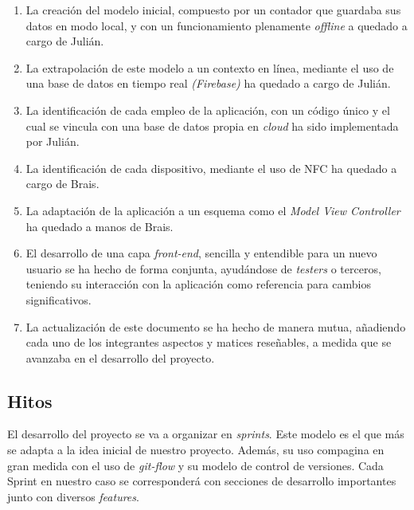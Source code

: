 \documentclass[a4paper,openright,12pt]{article}
\begin{document}
\begin{enumerate}
    \item La creación del modelo inicial, compuesto por un contador que guardaba sus datos en modo local, y con un funcionamiento plenamente \textit{offline} a quedado a cargo de Julián.
    \item La extrapolación de este modelo a un contexto en línea, mediante el uso de una base de datos en tiempo real \textit{(Firebase)} ha quedado a cargo de Julián.
    \item La identificación de cada empleo de la aplicación, con un código único y el cual se vincula con una base de datos propia en \textit{cloud} ha sido implementada por Julián.
    \item La identificación de cada dispositivo, mediante el uso de NFC ha quedado a cargo de Brais. 
    \item La adaptación de la aplicación a un esquema como el
    \textit{Model View Controller} ha quedado a manos de Brais.
    \item El desarrollo de una capa \textit{front-end}, sencilla y entendible para un nuevo usuario se ha hecho de forma conjunta, ayudándose de \textit{testers} o terceros, teniendo su interacción con la aplicación como referencia para cambios significativos.
    \item La actualización de este documento se ha hecho de manera mutua, añadiendo cada uno de los integrantes aspectos y matices reseñables, a medida que se avanzaba en el desarrollo del proyecto.
\end{enumerate}

\subsection{Hitos}
El desarrollo del proyecto se va a organizar en \textit{sprints}. Este modelo es el que más se adapta a la idea inicial de nuestro proyecto. Además, su uso compagina en gran medida con el uso de \textit{git-flow} y su modelo de control de versiones. Cada Sprint en nuestro caso se corresponderá con secciones de desarrollo importantes junto con diversos \textit{features}.
\end{document}
